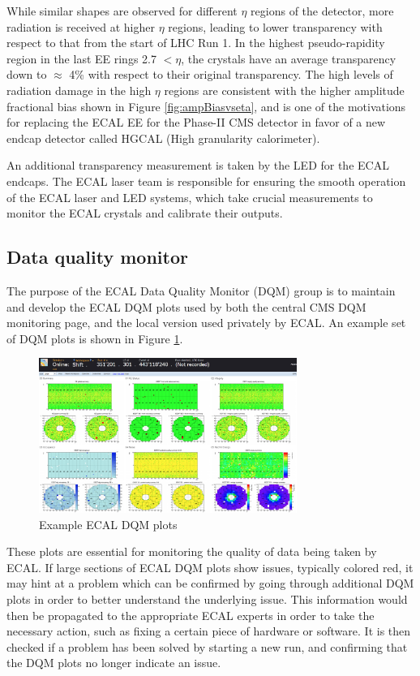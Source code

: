 While similar shapes are observed for different $\eta$ regions of the detector, more radiation is received at higher $\eta$ regions, leading to lower transparency with respect to that from the start of LHC Run 1. In the highest pseudo-rapidity region in the last EE rings 2.7 $< \eta$, the crystals have an average transparency down to $\approx$ 4\% with respect to their original transparency. The high levels of radiation damage in the high $\eta$ regions are consistent with the higher amplitude fractional bias shown in Figure \ref{fig:ampBiasvseta}, and is one of the motivations for replacing the ECAL EE for the Phase-II CMS detector in favor of a new endcap detector called HGCAL (High granularity calorimeter).

An additional transparency measurement is taken by the LED for the ECAL endcaps. The ECAL laser team is responsible for ensuring the smooth operation of the ECAL laser and LED systems, which take crucial measurements to monitor the ECAL crystals and calibrate their outputs. 

\subsection{Data quality monitor} \label{sec:ECAL_DQM}

The purpose of the ECAL Data Quality Monitor (DQM) group is to maintain and develop the ECAL DQM plots used by both the central CMS DQM monitoring page, and the local version used privately by ECAL. An example set of DQM plots is shown in Figure \ref{fig:ECAL_DQM_Plots}. 

\begin{figure}[H]
    \centering
    \includegraphics[width=0.75\textwidth]{Images/ECAL_Operations/ECAL_DQM_Plots.png}
    \caption{Example ECAL DQM plots}
    \label{fig:ECAL_DQM_Plots}
\end{figure}

These plots are essential for monitoring the quality of data being taken by ECAL. If large sections of ECAL DQM plots show issues, typically colored red, it may hint at a problem which can be confirmed by going through additional DQM plots in order to better understand the underlying issue. This information would then be propagated to the appropriate ECAL experts in order to take the necessary action, such as fixing a certain piece of hardware or software. It is then checked if a problem has been solved by starting a new run, and confirming that the DQM plots no longer indicate an issue.  

